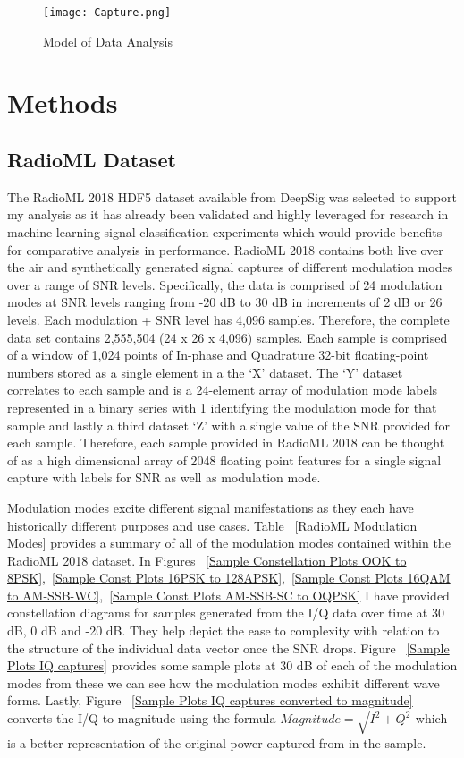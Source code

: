 \documentclass[conference]{IEEEtran}
\begin{document}
\begin{figure}[H]
\centering
\texttt{[image: Capture.png]}
\caption{Model of Data Analysis}
\label{model}
\end{figure}

\section{Methods}
\subsection{RadioML Dataset}
The RadioML 2018 HDF5 dataset available from DeepSig \cite{b9} was selected to support my analysis as it has already been validated and highly leveraged for research in machine learning signal classification experiments which would provide benefits for comparative analysis in performance.  RadioML 2018 contains both live over the air and synthetically generated signal captures of different modulation modes over a range of SNR levels.  Specifically, the data is comprised of 24 modulation modes at SNR levels ranging from -20 dB to 30 dB in increments of 2 dB or 26 levels. Each modulation + SNR level has 4,096 samples. Therefore, the complete data set contains 2,555,504 (24 x 26 x 4,096) samples.  Each sample is comprised of a window of 1,024 points of In-phase and Quadrature 32-bit floating-point numbers stored as a single element in a the ‘X’ dataset. The ‘Y’ dataset correlates to each sample and is a 24-element array of modulation mode labels represented in a binary series with 1 identifying the modulation mode for that sample and lastly a third dataset ‘Z’ with a single value of the SNR provided for each sample. Therefore, each sample provided in RadioML 2018 can be thought of as a high dimensional array of 2048 floating point features for a single signal capture with labels for SNR as well as modulation mode. 

Modulation modes excite different signal manifestations as they each have historically different purposes and use cases. Table ~\ref{RadioML Modulation Modes} provides a summary of all of the modulation modes contained within the RadioML 2018 dataset. In Figures ~\ref{Sample Constellation Plots OOK to 8PSK},~\ref{Sample Const Plots 16PSK to 128APSK},~\ref{Sample Const Plots 16QAM to AM-SSB-WC},~\ref{Sample Const Plots AM-SSB-SC to OQPSK} I have provided constellation diagrams for samples generated from the I/Q data over time at 30 dB, 0 dB and -20 dB. They help depict the ease to complexity with relation to the structure of the individual data vector once the SNR drops. Figure ~\ref{Sample Plots IQ captures} provides some sample plots at 30 dB of each of the modulation modes from these we can see how the modulation modes exhibit different wave forms. Lastly, Figure ~\ref{Sample Plots IQ captures converted to magnitude} converts the I/Q to magnitude using the formula $Magnitude = \sqrt{I^{2}+Q^{2}}$ which is a better representation of the original power captured from in the sample.
\end{document}
